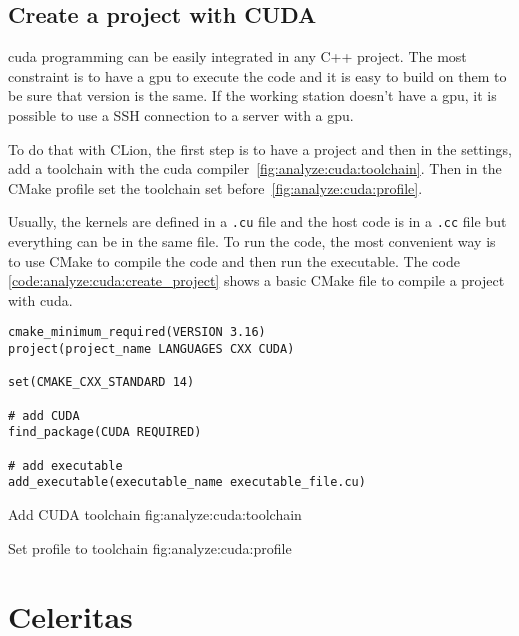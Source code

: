 \subsection{Create a project with CUDA}
\label{ch:analyze:cuda:create_project}

\acrshort{cuda} programming can be easily integrated in any C++ project.
The most constraint is to have a \acrshort{gpu} to execute the code and it is
easy to build on them to be sure that version is the same.
If the working station doesn't have a \acrshort{gpu}, it is possible to use a
SSH connection to a server with a \acrshort{gpu}.

To do that with CLion, the first step is to have a project and then in the
settings, add a toolchain with the \acrshort{cuda} compiler~\ref{fig:analyze:cuda:toolchain}.
Then in the CMake profile set the toolchain set before~\ref{fig:analyze:cuda:profile}.

Usually, the kernels are defined in a \texttt{.cu} file and the host code is in
a \texttt{.cc} file but everything can be in the same file.
To run the code, the most convenient way is to use CMake to compile the code
and then run the executable.
The code \ref{code:analyze:cuda:create_project} shows a basic CMake file to
compile a project with \acrshort{cuda}.

\begin{code}
    \label{code:analyze:cuda:create_project}
    \begin{verbatim}
cmake_minimum_required(VERSION 3.16)
project(project_name LANGUAGES CXX CUDA)

set(CMAKE_CXX_STANDARD 14)

# add CUDA
find_package(CUDA REQUIRED)

# add executable
add_executable(executable_name executable_file.cu)
    \end{verbatim}
\end{code}

{Add CUDA toolchain}
{fig:analyze:cuda:toolchain}

{Set profile to toolchain}
{fig:analyze:cuda:profile}



\section{Celeritas}
\label{ch:analyze:atlas}

